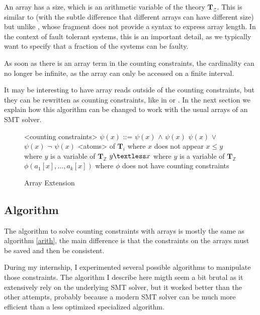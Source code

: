 \documentclass[]{article}
\begin{document}
An array has a size, which is an arithmetic variable of the theory
$\mathbf{T}_\mathcal{Z}$. This is similar to
\cite{AlbertiGP16} (with the subtle difference that
different arrays can have different size) but unlike
\cite{ConchonGKMZ12}, whose fragment does not
provide a syntax to express array length. In the context of fault
tolerant systems, this is an important detail, as we typically want to
specify that a fraction of the systems can be faulty.

As soon as there is an array term in the counting constraints, the
cardinality can no longer be infinite, as the array can only be accessed
on a finite interval.

It may be interesting to have array reads outside of the counting
constraints, but they can be rewritten as counting constraints, like in
\cite{ref-bradley2006s} or
\cite{AlbertiGP16}. In the next section we explain
how this algorithm can be changed to work with the usual arrays of an
SMT solver.

\begin{figure}[h]
\begin{grammar}
    
<counting constraints> $\psi(x)$ ::= $\psi(x)$ $\land$ $\psi(x)$
\alt $\psi(x)$ $\lor$ $\psi(x)$
\alt $\lnot$ $\psi(x)$
\alt <atoms> of $\mathbf{T}_i$ where $x$ does not appear
\alt $x \leq y$ where $y$ is a variable of $\mathbf{T}_\mathbb{Z}$
\alt $y \textless x$ where $y$ is a variable of $\mathbf{T}_\mathbb{Z}$
\alt $\phi(a_1[x], \ldots, a_k[x])$ where $\phi$ does not have counting constraints


\end{grammar}
\caption{Array Extension}
\label{syntaxarray}
\end{figure}

\subsection{Algorithm}\label{algorithm}

The algorithm to solve counting constraints with arrays is mostly the
same as algorithm \ref{arith}, the main difference is that the
constraints on the arrays must be saved and then be consistent.

During my internship, I experimented several possible algorithms to
manipulate those constraints. The algorithm I describe here migth seem a
bit brutal as it extensively rely on the underlying SMT solver, but it
worked better than the other attempts, probably because a modern SMT
solver can be much more efficient than a less optimized specialized
algorithm.
\end{document}
